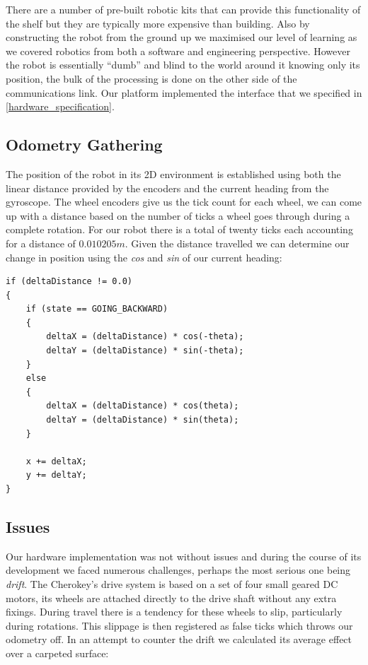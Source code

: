 \noindent
There are a number of pre-built robotic kits that can provide this functionality of the shelf but they are typically more expensive than building. Also by constructing the robot from the ground up we maximised our level of learning as we covered robotics from both a software and engineering perspective. However the robot is essentially ``dumb'' and blind to the world around it knowing only its position, the bulk of the processing is done on the other side of the communications link. Our platform implemented the interface that we specified in \ref{hardware_specification}.

\newpage

\subsection{Odometry Gathering}
\noindent
The position of the robot in its 2D environment is established using both the linear distance provided by the encoders and the current heading from the gyroscope. The wheel encoders give us the tick count for each wheel, we can come up with a distance based on the number of ticks a wheel goes through during a complete rotation. For our robot there is a total of twenty ticks each accounting for a distance of $0.010205m$. Given the distance travelled we can determine our change in position using the \textit{cos} and \textit{sin} of our current heading: \\

\begin{lstlisting}
if (deltaDistance != 0.0)
{
	if (state == GOING_BACKWARD)
	{
		deltaX = (deltaDistance) * cos(-theta);
		deltaY = (deltaDistance) * sin(-theta);
	}
	else
	{
		deltaX = (deltaDistance) * cos(theta);
		deltaY = (deltaDistance) * sin(theta);
	}

	x += deltaX;
	y += deltaY;
}
\end{lstlisting}

\newpage

\subsection{Issues}
\noindent
Our hardware implementation was not without issues and during the course of its development we faced numerous challenges, perhaps the most serious one being \textit{drift}. The Cherokey's drive system is based on a set of four small geared DC motors, its wheels are attached directly to the drive shaft without any extra fixings. During travel there is a tendency for these wheels to slip, particularly during rotations. This slippage is then registered as false ticks which throws our odometry off. In an attempt to counter the drift we calculated its average effect over a carpeted surface: \\

